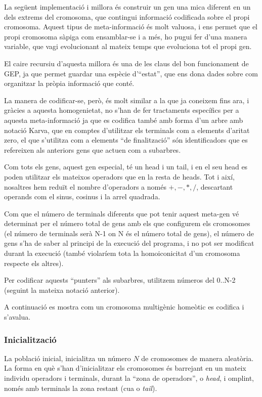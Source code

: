La següent implementació i millora és construir un gen una mica diferent en un
dels extrems del cromosoma, que contingui informació codificada sobre el propi
cromosoma.  Aquest tipus de meta-informació és molt valuosa, i ens permet que el
propi cromosoma sàpiga com ensamblar-se i a més, ho pugui fer d'una manera
variable, que vagi evolucionant al mateix temps que evoluciona tot el propi gen.

El caire recursiu d'aquesta millora és una de les claus del bon funcionament de
GEP, ja que permet guardar una espècie d'``estat'', que ens dona dades sobre com
organitzar la pròpia informació que conté.

La manera de codificar-se, però, és molt similar a la que ja coneixem fins ara,
i gràcies a aquesta homogenietat, no s'han de fer tractaments específics per a
aquesta meta-informació ja que es codifica també amb forma d'un arbre amb notació
Karva, que en comptes d'utilitzar els terminals com a elements d'aritat zero, el
que s'utilitza com a elements ``de finalització'' són identificadors que es
refereixen als anteriors gens que actuen com a subarbres.

Com tots els gens, aquest gen especial, té un head i un tail, i en el seu head
es poden utilitzar els mateixos operadors que en la resta de heads.  Tot i així,
nosaltres hem reduït el nombre d'operadors a només $+,-,*,/$, descartant
operands com el sinus, cosinus i la arrel quadrada.

Com que el número de terminals diferents que pot tenir aquest meta-gen vé
determinat per el número total de gens amb els que configurem els cromosomes (el
número de terminals serà N-1 on N és el número total de gens), el número de gens
s'ha de saber al principi de la execució del programa, i no pot ser modificat
durant la execució (també violaríem tota la homoiconicitat  d'un cromosoma respecte
els altres).

Per codificar aquests ``punters'' als subarbres, utilitzem números del 0..N-2
(seguint la mateixa notació anterior).

A continuació es mostra com un cromosoma multigènic homeòtic es codifica i
s'avalua.


\subsubsection{Inicialització} %
\label{ssub:Inicialitzacio}
La població inicial, inicialitza un número $N$ de cromosomes de manera
aleatòria.  La forma en què s'han d'inicialitzar els cromosomes és barrejant en
un mateix individu operadors i terminals, durant la ``zona de operadors'', o
\emph{head}, i omplint, només amb terminals la zona restant (cua o \emph{tail}).

